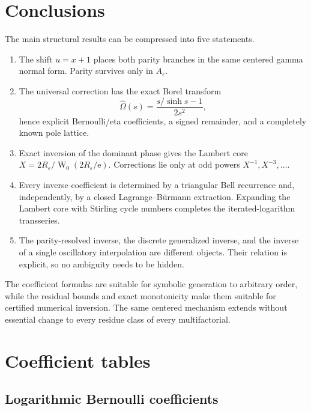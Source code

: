 \documentclass[11pt,a4paper,oneside]{book}
\newcommand{\e}{\mathrm e}
\newcommand{\W}{\operatorname W}
\newcommand{\eps}{\varepsilon}
\begin{document}
\chapter{Conclusions}

The main structural results can be compressed into five statements.

\begin{enumerate}[label=\textup{\arabic*.},leftmargin=2.2em]
\item The shift \(u=x+1\) places both parity branches in the same centered
      gamma normal form.  Parity survives only in \(A_\eps\).
\item The universal correction has the exact Borel transform
      \[
       \widehat\Omega(s)=\frac{s/\sinh s-1}{2s^2},
      \]
      hence explicit Bernoulli/eta coefficients, a signed remainder, and a
      completely known pole lattice.
\item Exact inversion of the dominant phase gives the Lambert core
      \(X=2R_\eps/\W_0(2R_\eps/\e)\).  Corrections lie only at odd powers
      \(X^{-1},X^{-3},\ldots\).
\item Every inverse coefficient is determined by a triangular Bell recurrence
      and, independently, by a closed Lagrange--B\"urmann extraction.
      Expanding the Lambert core with Stirling cycle numbers completes the
      iterated-logarithm transseries.
\item The parity-resolved inverse, the discrete generalized inverse, and the
      inverse of a single oscillatory interpolation are different objects.
      Their relation is explicit, so no ambiguity needs to be hidden.
\end{enumerate}

The coefficient formulas are suitable for symbolic generation to arbitrary
order, while the residual bounds and exact monotonicity make them suitable for
certified numerical inversion.  The same centered mechanism extends without
essential change to every residue class of every multifactorial.

\appendix

\chapter{Coefficient tables}

\section{Logarithmic Bernoulli coefficients}
\end{document}
